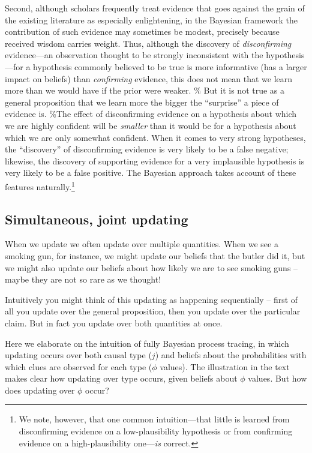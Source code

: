 \documentclass[
  12pt,
]{book}
\begin{document}
Second, although scholars frequently treat evidence that goes against the grain of the existing literature as especially enlightening, in the Bayesian framework the contribution of such evidence may sometimes be modest, precisely because received wisdom carries weight. Thus, although the discovery of \emph{disconfirming} evidence---an observation thought to be strongly inconsistent with the hypothesis---for a hypothesis commonly believed to be true is more informative (has a larger impact on beliefs) than \emph{confirming} evidence, this does not mean that we learn more than we would have if the prior were weaker. \% But it is not true as a general proposition that we learn more the bigger the ``surprise'' a piece of evidence is.
\%The effect of disconfirming evidence on a hypothesis about which we are highly confident will be \emph{smaller} than it would be for a hypothesis about which we are only somewhat confident.
When it comes to very strong hypotheses, the ``discovery'' of disconfirming evidence is very likely to be a false negative; likewise, the discovery of supporting evidence for a very implausible hypothesis is very likely to be a false positive. The Bayesian approach takes account of these features naturally.\footnote{We note, however, that one common intuition---that little is learned from disconfirming evidence on a low-plausibility hypothesis or from confirming evidence on a high-plausibility one---\emph{is} correct.}

\hypertarget{simultaneous-joint-updating}{%
\subsection{Simultaneous, joint updating}\label{simultaneous-joint-updating}}

When we update we often update over multiple quantities. When we see a smoking gun, for instance, we might update our beliefs that the butler did it, but we might also update our beliefs about how likely we are to see smoking guns -- maybe they are not so rare as we thought!

Intuitively you might think of this updating as happening sequentially -- first of all you update over the general proposition, then you update over the particular claim. But in fact you update over both quantities at once.

Here we elaborate on the intuition of fully Bayesian process tracing, in which updating occurs over both causal type (\(j\)) and beliefs about the probabilities with which clues are observed for each type (\(\phi\) values). The illustration in the text makes clear how updating over type occurs, given beliefs about \(\phi\) values. But how does updating over \(\phi\) occur?
\end{document}
